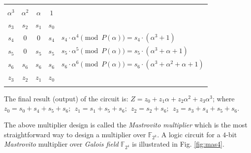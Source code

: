 \begin{Example}
{\begin{tabular}{|c c c c | l }
 \multicolumn{5}{c}{} \\
 \multicolumn{1}{c}{$\alpha^3$} & $\alpha^2$ & $\alpha$ & \multicolumn{1}{c}{$1$} &  \\
\hhline{----~}
  $s_3$ 	&$s_2$  	&$s_1$   &$s_0$ 	&   \\
 \hline
 $s_4$ 		&$0$		&$0$ 	 &$s_4$  	&$s_4\cdot \alpha^4 \pmod{P(\alpha)} = s_4 \cdot (\alpha^3 + 1)$\\
 $s_5$ 		&$0$		&$s_5$   &$s_5$     &$s_5\cdot \alpha^5 \pmod{P(\alpha)} = s_5\cdot (\alpha^3+ \alpha + 1)$\\
 $s_6$ 		&$s_6$		&$s_6$   &$s_6$     &$s_6\cdot \alpha^6 \pmod{ P(\alpha)} = s_6\cdot( \alpha^3 + \alpha^2 + \alpha + 1)$\\
 \hline
 $z_3$ 		&$z_2$ 		&$z_1$   &$z_0$ 	&\\
 \multicolumn{5}{c}{} \\
 \end{tabular}\par}

The final result (output) of the circuit is: $Z = z_0 + z_1 \alpha + z_2
\alpha^2 + z_3 \alpha^3$; where  $z_0=s_0+s_4+s_5+s_6; ~~z_1=s_1+s_5+s_6;
~~z_2=s_2+s_6; ~~z_3=s_3+s_4+s_5+s_6$. 
\end{Example}


The above multiplier design is called the {\it Mastrovito multiplier} \cite{mastro:1989} 
which is the most straightforward way to design a multiplier over $\mathbb{F}_{2^k}$. 
A logic circuit for a $4$-bit {\it Mastrovito} multiplier over {\it Galois field} $\mathbb{F}_{2^4}$ is illustrated in Fig. \ref{fig:mas4}.

